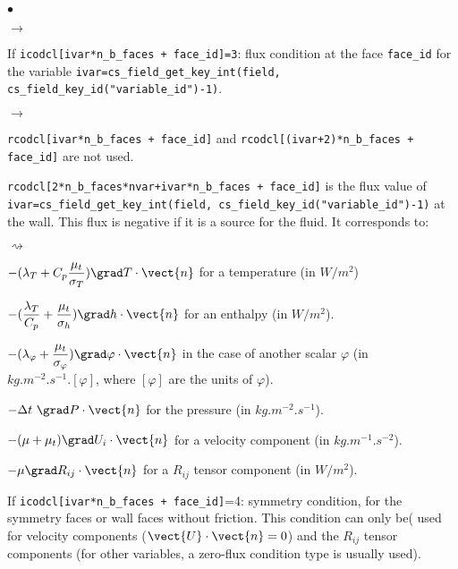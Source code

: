 \begin{list}{$\bullet$}{}
\begin{list}{$\rightarrow$}{}
\end{list}

\item If \texttt{icodcl[ivar*n\_b\_faces + face\_id]=3}: flux condition at the face \texttt{face\_id}
      for the variable \texttt{ivar=cs\_field\_get\_key\_int(field,
       cs\_field\_key\_id("variable\_id")-1)}.

\begin{list}{$\rightarrow$}{}
\item \texttt{rcodcl[ivar*n\_b\_faces + face\_id]} and \texttt{rcodcl[(ivar+2)*n\_b\_faces + face\_id]} are not used.

\item \texttt{rcodcl[2*n\_b\_faces*nvar+ivar*n\_b\_faces + face\_id]} is the flux value of \texttt{ivar=cs\_field\_get\_key\_int(field,
       cs\_field\_key\_id("variable\_id")-1)} at the
      wall. This flux is negative if it is a source for the fluid. It corresponds to:
\begin{list}{$\rightsquigarrow$}{}
\item
$\displaystyle -(\lambda_T+C_p\frac{\mu_t}{\sigma_T})\grad T\cdot\vect{n}$ for a temperature (in $W/m^2$)

$\displaystyle -(\frac{\lambda_T}{C_p}+\frac{\mu_t}{\sigma_h})\grad h\cdot\vect{n}$
     for an enthalpy (in $W/m^2$).

$\displaystyle -(\lambda_\varphi+\frac{\mu_t}{\sigma_\varphi})\grad\varphi\cdot\vect{n}$ in the case of another scalar $\varphi$ (in $kg.m^{-2}.s^{-1}.[\varphi]$, where $[\varphi]$ are the units of $\varphi$).

\item $-\Delta t\ \grad P\cdot\vect{n}$ for the pressure (in $kg.m^{-2}.s^{-1}$).

\item $-(\mu+\mu_t)\grad U_i\cdot\vect{n}$ for a velocity component (in $kg.m^{-1}.s^{-2}$).

\item $-\mu\grad R_{ij}\cdot\vect{n}$ for a $R_{ij}$ tensor component (in $W/m^2$).
\end{list}

\end{list}

\item If \texttt{icodcl[ivar*n\_b\_faces + face\_id]}=4: symmetry condition, for the symmetry
      faces or wall faces without friction. This condition can only be(
      used for velocity components ($\vect{U}\cdot\vect{n}=0$) and
      the $R_{ij}$ tensor components (for other variables, a zero-flux
      condition type is usually used).\\


\end{list}
